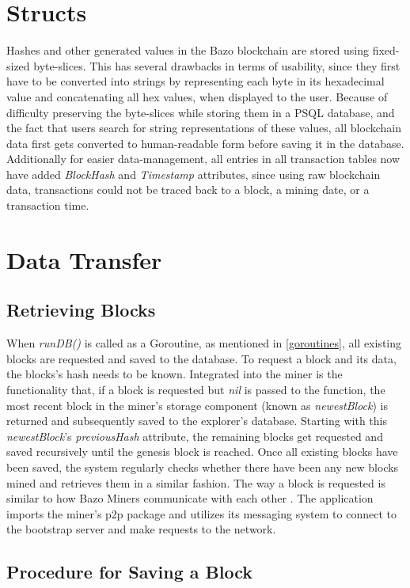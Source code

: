 \section{Structs}
Hashes and other generated values in the Bazo blockchain are stored using fixed-sized byte-slices. This has several drawbacks in terms of usability, since they first have to be converted into strings by representing each byte in its hexadecimal value and concatenating all hex values, when displayed to the user. Because of difficulty preserving the byte-slices while storing them in a PSQL database, and the fact that users search for string representations of these values, all blockchain data first gets converted to human-readable form before saving it in the database. Additionally for easier data-management, all entries in all transaction tables now have added \emph{BlockHash} and \emph{Timestamp} attributes, since using raw blockchain data, transactions could not be traced back to a block, a mining date, or a transaction time.

\section{Data Transfer} \label{data}

\subsection{Retrieving Blocks} \label{retrieve}
When \emph{runDB()} is called as a Goroutine, as mentioned in \ref{goroutines}, all existing blocks are requested and saved to the database. To request a block and its data, the blocks's hash needs to be known. Integrated into the miner is the functionality that, if a block is requested but \emph{nil} is passed to the function, the most recent block in the miner's storage component (known as \emph{newestBlock}) is returned and subsequently saved to the explorer's database. Starting with this  \emph{newestBlock}'s \emph{previousHash} attribute, the remaining blocks get requested and saved recursively until the genesis block is reached. Once all existing blocks have been saved, the system regularly checks whether there have been any new blocks mined and retrieves them in a similar fashion.
The way a block is requested is similar to how Bazo Miners communicate with each other \cite{bazo}. The application imports the miner's p2p package and utilizes its messaging system to connect to the bootstrap server and make requests to the network.

\subsection{Procedure for Saving a Block} \


